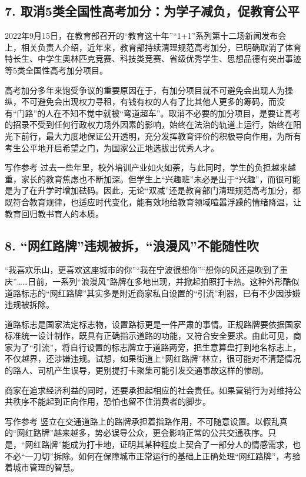 \subsection*{7. 取消5类全国性高考加分：为学子减负，促教育公平}

2022年9月15日，在教育部召开的“教育这十年”“1+1”系列第十二场新闻发布会上，相关负责人介绍，近年来，教育部持续清理规范高考加分，已明确取消了体育特长生、中学生奥林匹克竞赛、科技类竞赛、省级优秀学生、思想品德有突出事迹等5类全国性高考加分项目。

高考加分多年来饱受争议的重要原因在于，有加分项目就不可避免会出现人为操纵，不可避免会出现权力寻租，有钱有权的人有了比其他人更多的筹码，而没有“门路”的人在不知不觉中就被“弯道超车”。取消不必要的加分项目，是要让高考的招录不受到任何行政权力场外因素的影响，始终在法治的轨道上运行，始终在阳光下前行，最大力度地保证公开透明，充分发挥教育评价的积极导向作用，为所有考生公平地开启希望之门，为国家公正地选拔出优秀人才。

\begin{quoteBox}{写作参考}
过去一些年里，校外培训产业如火如荼，与此同时，学生的负担越来越重，家长的教育焦虑也不断加深。但学生上“兴趣班”未必是出于“兴趣”，而很可能是为了在升学时增加砝码。因此，无论“双减”还是教育部门清理规范高考加分，都既符合教育规律，也适应时代变化，能有效地给教育领域喧嚣浮躁的情绪降温，让教育回归教书育人的本质。
\end{quoteBox}

\subsection*{8. “网红路牌”违规被拆，“浪漫风”不能随性吹}

“我喜欢乐山，更喜欢这座城市的你”“我在宁波很想你”“想你的风还是吹到了重庆”……日前，一系列“浪漫风”路牌在多地出现，并掀起拍照打卡热。这种外形酷似道路标志的“网红路牌”其实多是附近商家私自设置的“引流”利器，已有不少因涉嫌违规被拆除。

道路标志是国家法定标志物，设置路标更是一件严肃的事情。正规路牌要依据国家标准统一设计制作，既具有正确指示道路的功能，又符合安全要求。由此可见，商家为了“引流”，将自行设置的标志牌立于道路两旁，把生意算盘打到地名标志上，不仅越界，还涉嫌违规。试想，如果街道上“网红路牌”林立，很可能对不清楚情况的路人、司机产生误导，更别提打卡聚集可能引发交通事故这样的惨剧。

商家在追求经济利益的同时，还要承担起相应的社会责任。如果营销行为对维持公共秩序不能起到正向作用，恐怕也留不住消费者的脚步。

\begin{quoteBox}{写作参考}
竖立在交通道路上的路牌承担着指路作用，不可随意设置。以假乱真的“网红路牌”越来越多，势必误导公众，更会影响正常的公共交通秩序。只是，“网红路牌”能成为打卡地，证明其某种程度上契合了一部分人的情感需求，也不必“一刀切”拆除。如何在保障城市正常运行的基础上正确处理“网红路牌”，考验着城市管理的智慧。
\end{quoteBox}

